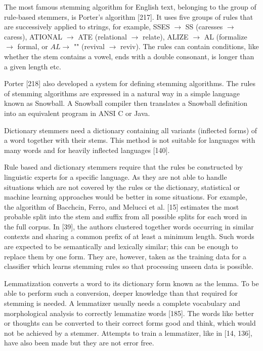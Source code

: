 \documentclass[11pt,openany,executivepaper]{book}
\begin{document}
The most famous stemming algorithm for English text, belonging to the group of rule-based stemmers, is Porter's algorithm [217]. It uses five groups of rules that are successively applied to strings, for example, SSES $\rightarrow$ SS (caresses $\rightarrow$ caress), ATIONAL $\rightarrow$ ATE (relational $\rightarrow$ relate), ALIZE $\rightarrow$ AL (formalize $\rightarrow$ formal, or $A L \rightarrow$ "" (revival $\rightarrow$ reviv). The rules can contain conditions, like whether the stem contains a vowel, ends with a double consonant, is longer than a given length etc.

Porter [218] also developed a system for defining stemming algorithms. The rules of stemming algorithms are expressed in a natural way in a simple language known as Snowball. A Snowball compiler then translates a Snowball definition into an equivalent program in ANSI C or Java.

Dictionary stemmers need a dictionary containing all variants (inflected forms) of a word together with their stems. This method is not suitable for languages with many words and for heavily inflected languages [140].

Rule based and dictionary stemmers require that the rules be constructed by linguistic experts for a specific language. As they are not able to handle situations which are not covered by the rules or the dictionary, statistical or machine learning approaches would be better in some situations. For example, the algorithm of Bacchcin, Ferro, and Melucci et al. [15] estimates the most probable split into the stem and suffix from all possible splits for each word in the full corpus. In [39], the authors clustered together words occurring in similar contexts and sharing a common prefix of at least a minimum length. Such words are expected to be semantically and lexically similar; this can be enough to replace them by one form. They are, however, taken as the training data for a classifier which learns stemming rules so that processing unseen data is possible.
\begin{sloppypar}  
Lemmatization converts a word to its dictionary form known as the lemma. To be able to perform such a conversion, deeper knowledge than that required for stemming is needed. A lemmatizer usually needs a complete vocabulary and morphological analysis to correctly lemmatize words [185]. The words like better or thoughts can be converted to their correct forms good and think, which would not be achieved by a stemmer. Attempts to train a lemmatizer, like in [14, 136], have also been made but they are not error free.
\end{sloppypar}
\end{document}
